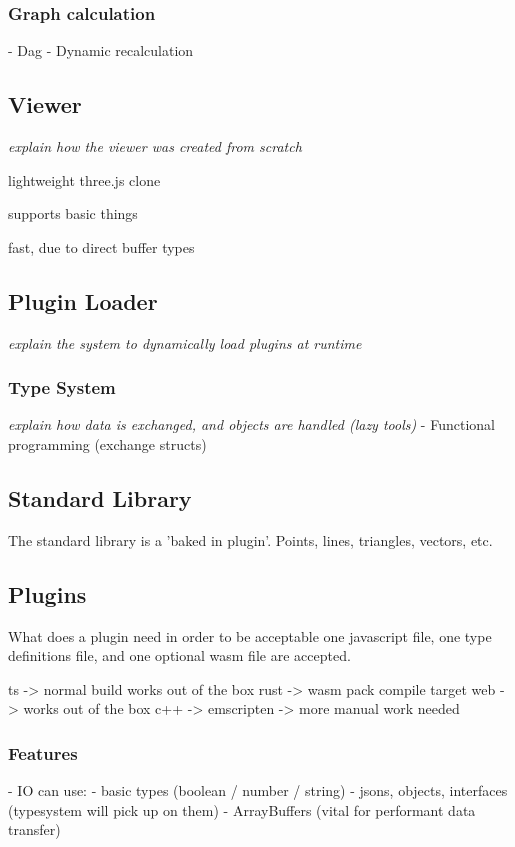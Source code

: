 \subsubsection*{Graph calculation}
  - Dag
  - Dynamic recalculation 

\subsection{Viewer}
\emph{explain how the viewer was created from scratch}

lightweight three.js clone

supports basic things

fast, due to direct buffer types

\subsection{ Plugin Loader } 

\emph{explain the system to dynamically load plugins at runtime}

\subsubsection{ Type System }

\emph{explain how data is exchanged, and objects are handled (lazy tools)}
- Functional programming (exchange structs)

\subsection{ Standard Library }

The standard library is a 'baked in plugin'.
Points, lines, triangles, vectors, etc.

\subsection{ Plugins }
What does a plugin need in order to be acceptable
one javascript file, one type definitions file, and one optional wasm file are accepted. 

ts -> normal build works out of the box
rust -> wasm pack compile target web -> works out of the box 
c++ -> emscripten -> more manual work needed 

\subsubsection{Features}
- IO can use:
  - basic types (boolean / number / string)
  - jsons, objects, interfaces (typesystem will pick up on them)
  - ArrayBuffers (vital for performant data transfer)



